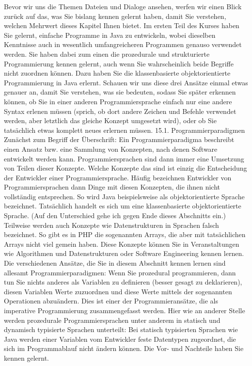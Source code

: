 Bevor wir uns die Themen Dateien und Dialoge ansehen, werfen wir einen Blick zurück auf das, was Sie bislang kennen gelernt haben, damit Sie verstehen, welchen Mehrwert dieses Kapitel Ihnen bietet.
Im ersten Teil des Kurses haben Sie gelernt, einfache Programme in Java zu entwickeln, wobei dieselben Kenntnisse auch in wesentlich umfangreicheren Programmen genauso verwendet werden. Sie haben dabei zum einen die prozedurale und strukturierte Programmierung kennen gelernt, auch wenn Sie wahrscheinlich beide Begriffe nicht zuordnen können. Dazu haben Sie die klassenbasierte objektorientierte Programmierung in Java erlernt.
Schauen wir uns diese drei Ansätze einmal etwas genauer an, damit Sie verstehen, was sie bedeuten, sodass Sie später erkennen können, ob Sie in einer anderen Programmiersprache einfach nur eine andere Syntax erlenen müssen (sprich, ob dort andere Zeichen und Befehle verwendet werden, aber letztlich das gleiche Konzept umgesetzt wird), oder ob Sie tatsächlich etwas komplett neues erlernen müssen.
15.1.	Programmierparadigmen
Zunächst zum Begriff der Überschrift: Ein Programmierparadigma beschreibt einen Ansatz bzw. eine Sammlung von Konzepten, nach denen Software entwickelt werden kann. Programmiersprachen sind dann immer eine Umsetzung von Teilen dieser Konzepte. Welche Konzepte das sind ist einzig die Entscheidung der Entwickler einer Programmiersprache. Häufig bezeichnen Entwickler von Programmiersprachen dann Dinge mit diesen Konzepten, die ihnen nicht vollständig entsprechen. So wird Java beispielsweise als objektorientierte Sprache bezeichnet. Tatsächlich handelt es sich um eine klassenbasierte objektorientierte Sprache. (Auf den Unterschied gehe ich gegen Ende dieses Abschnitts ein.) Teilweise werden auch Konzepte wie Datenstrukturen in Sprachen falsch bezeichnet. So gibt es in PHP die sogenannten Arrays, die aber mit tatsächlichen Arrays nicht viel gemein haben. Diese Konzepte können Sie in Veranstaltungen wie Algorithmen und Datenstrukturen oder Software Engineering kennen lernen.
Die verschiedenen Ansätze, die Sie in diesem Abschnitt kennen lernen sind allesamt Programmierparadigmen:
Wenn Sie prozedural programmieren, dann tun Sie nichts anderes als Variablen zu definieren (besser gesagt zu deklarieren), diesen Variablen Werte zuzuordnen und diese Werte mittels der sogenannten Operationen abzuändern. Dies ist einer der Programmieransätze, die als imperative Programmierung zusammengefasst werden. 
Hier wie an anderer Stelle werden prozedurale Programmiersprachen unter anderem in statisch und dynamisch typisierte Sprachen unterteilt: Bei statisch typisierten Sprachen wie Java werden einer Variablen vom Entwickler feste Datentypen zugeordnet, die sich im Programmablauf nicht ändern können. Die Vor- und Nachteile haben Sie kennen gelernt.
